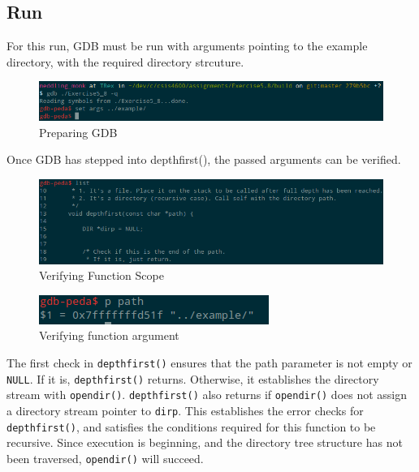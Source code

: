 \documentclass[a4paper,12pt,sffamily]{article}
\begin{document}
\subsection{Run}
For this run, GDB must be run with arguments pointing to the example directory, with the required 
directory strcuture.
\begin{figure}[H]
\centering
\includegraphics[width=1\linewidth]{./images/1}
\caption[GDB_prep]{Preparing GDB}
\label{fig:1}
\end{figure}
Once GDB has stepped into depthfirst(), the passed arguments can be verified.
\begin{figure}[H]
	\centering
	\includegraphics[width=1\linewidth]{./images/2}
	\caption[GDB_verify_1]{Verifying Function Scope}
	\label{fig:2}
\end{figure}
\begin{figure}[H]
	\centering
	\includegraphics[width=.5\linewidth]{./images/3}
	\caption[GDB_verify_2]{Verifying function argument}
	\label{fig:3}
\end{figure}
The first check in \texttt{depthfirst()} ensures that the path parameter is not empty or 
\texttt{NULL}. If it is, \texttt{depthfirst()} returns. Otherwise, it establishes the 
directory stream with \texttt{opendir()}. \texttt{depthfirst()} also returns if 
\texttt{opendir()} does not assign a directory stream pointer to \texttt{dirp}. This 
establishes the error checks for \texttt{depthfirst()}, and satisfies the conditions required for 
this function to be recursive.
Since execution is beginning, and the directory tree structure has not been traversed, 
\texttt{opendir()} will succeed.
\end{document}
